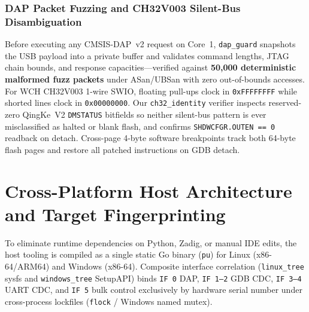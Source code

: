 \documentclass[journal]{IEEEtran}
\begin{document}
\subsubsection{DAP Packet Fuzzing and CH32V003 Silent-Bus Disambiguation}
Before executing any CMSIS-DAP~v2 request on Core~1, \texttt{dap\_guard} snapshots the USB payload into a private buffer and validates command lengths, JTAG chain bounds, and response capacities—verified against \textbf{50,000 deterministic malformed fuzz packets} under ASan/UBSan with zero out-of-bounds accesses. For WCH CH32V003 1-wire SWIO, floating pull-ups clock in \texttt{0xFFFFFFFF} while shorted lines clock in \texttt{0x00000000}. Our \texttt{ch32\_identity} verifier inspects reserved-zero QingKe~V2 \texttt{DMSTATUS} bitfields so neither silent-bus pattern is ever misclassified as halted or blank flash, and confirms \texttt{SHDWCFGR.OUTEN == 0} readback on detach. Cross-page 4-byte software breakpoints track both 64-byte flash pages and restore all patched instructions on GDB detach.

\section{Cross-Platform Host Architecture and Target Fingerprinting}
\label{sec:host}
To eliminate runtime dependencies on Python, Zadig, or manual IDE edits, the host tooling is compiled as a single static Go binary (\texttt{pu}) for Linux (x86-64/ARM64) and Windows (x86-64). Composite interface correlation (\texttt{linux\_tree} sysfs and \texttt{windows\_tree} SetupAPI) binds \texttt{IF~0} DAP, \texttt{IF~1--2} GDB CDC, \texttt{IF~3--4} UART CDC, and \texttt{IF~5} bulk control exclusively by hardware serial number under cross-process lockfiles (\texttt{flock} / Windows named mutex).
\end{document}
